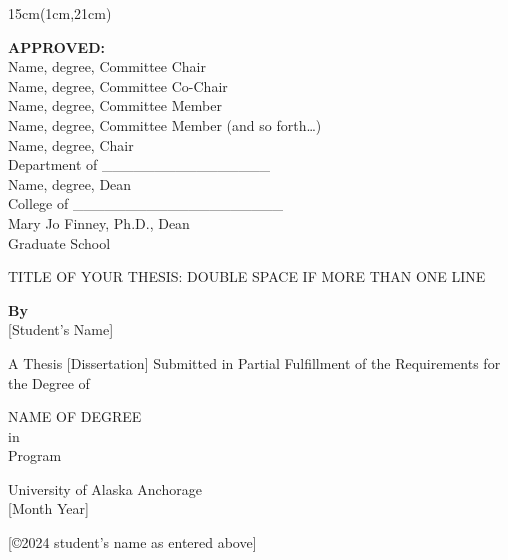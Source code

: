 \documentclass[12pt,letterpaper]{book}
\begin{document}
\begin{textblock*}{15cm}(1cm,21cm)
\begin{flushleft}
    \singlespacing
    \textbf{APPROVED:} \\
    Name, degree, Committee Chair \\
    Name, degree, Committee Co-Chair \\
    Name, degree, Committee Member \\
    Name, degree, Committee Member (and so forth…) \\
    Name, degree, Chair \\
    Department of \_\_\_\_\_\_\_\_\_\_\_\_\_\_\_\_ \\
    Name, degree, Dean \\
    College of \_\_\_\_\_\_\_\_\_\_\_\_\_\_\_\_\_\_\_\_ \\
    Mary Jo Finney, Ph.D., Dean \\
    Graduate School
\end{flushleft}
\end{textblock*}

\begin{titlepage}
\begin{center}
    \MakeUppercase{\large Title of Your Thesis: Double space if more than one line}
    
    \vspace{1cm}
    
    \textbf{By}\\
    \vspace{1cm}
    {[Student's Name]}
    
    \vspace{1.5cm}
    
    A Thesis [Dissertation] Submitted in Partial Fulfillment of the Requirements for the Degree of\\ 

    \vspace{2cm}
    
    \MakeUppercase{Name of Degree}\\
    \vspace{1cm}
    in\\
    \vspace{1cm}
    Program\\ 
    
    \vspace{1.5cm}
    
    University of Alaska Anchorage\\
    \vspace{1cm}
    {[Month Year]}\\

    \vspace{1.5cm}
    
    {[©2024 student’s name as entered above]}
\end{center}
\end{titlepage}
\end{document}
